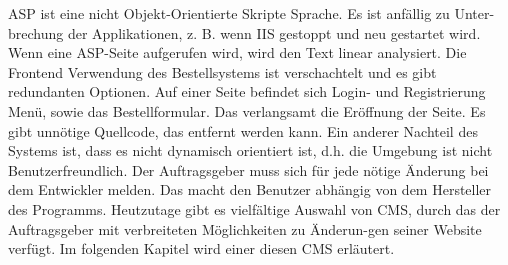 ASP ist eine nicht Objekt-Orientierte Skripte Sprache. Es ist anfällig zu Unter-brechung der Applikationen, z. B. wenn \ac{IIS} gestoppt und neu gestartet wird. Wenn eine ASP-Seite aufgerufen wird, wird den Text linear analysiert.
Die Frontend Verwendung des Bestellsystems ist verschachtelt und es gibt redundanten Optionen. Auf einer Seite befindet sich Login- und Registrierung Menü, sowie das Bestellformular. Das verlangsamt die Eröffnung der Seite. 
Es gibt unnötige Quellcode, das entfernt werden kann. Ein anderer Nachteil des Systems ist, dass es nicht dynamisch orientiert ist, d.h. die Umgebung ist nicht Benutzerfreundlich. Der Auftragsgeber muss sich für jede nötige Änderung bei dem Entwickler melden. Das macht den Benutzer abhängig von dem Hersteller des Programms.
Heutzutage gibt es vielfältige Auswahl von CMS, durch das der Auftragsgeber mit verbreiteten Möglichkeiten zu Änderun-gen seiner Website verfügt. 
Im folgenden Kapitel wird einer diesen CMS erläutert.




